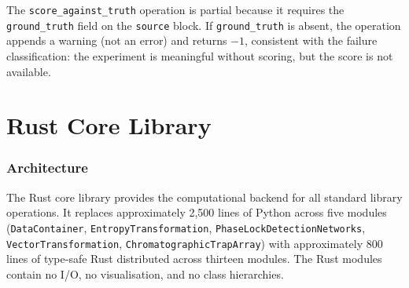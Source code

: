 \documentclass[11pt,a4paper]{article}
\theoremstyle{planstyle}
\theoremstyle{definition}
\theoremstyle{remark}
\newcommand{\shk}[1]{\texttt{#1}}
\begin{document}
The \shk{score\_against\_truth} operation is partial because it requires
the \shk{ground\_truth} field on the \shk{source} block. If
\shk{ground\_truth} is absent, the operation appends a warning (not an
error) and returns $-1$, consistent with the failure classification:
the experiment is meaningful without scoring, but the score is not
available.

\part{Rust Core Library}

\section{Architecture}
\label{sec:rust-arch}

The Rust core library provides the computational backend for all
standard library operations. It replaces approximately 2,500 lines of
Python across five modules (\shk{DataContainer}, \shk{EntropyTransformation},
\shk{PhaseLockDetectionNetworks}, \shk{VectorTransformation},
\shk{ChromatographicTrapArray}) with approximately 800 lines of
type-safe Rust distributed across thirteen modules. The Rust modules
contain no I/O, no visualisation, and no class hierarchies.
\end{document}
